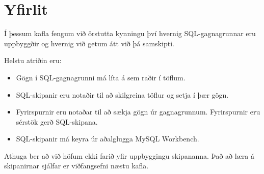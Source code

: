 \section{Yfirlit}
Í þessum kafla fengum við örstutta kynningu því hvernig SQL-gagnagrunnar eru uppbyggðir og hvernig við getum átt við þá samskipti. 

Helstu atriðin eru:
\begin{itemize}
 \item Gögn í SQL-gagnagrunni má líta á sem raðir í töflum.
 \item SQL-skipanir eru notaðir til að skilgreina töflur og setja í þær gögn.
 \item Fyrirspurnir eru notaðar til að sækja gögn úr gagnagrunnum. Fyrirspurnir eru sérstök gerð SQL-skipana.
 \item SQL-skipanir má keyra úr aðalglugga MySQL Workbench.
\end{itemize}
Athuga ber að við höfum ekki farið yfir uppbyggingu skipananna. Það að læra á skipanirnar sjálfar er viðfangsefni næstu kafla.